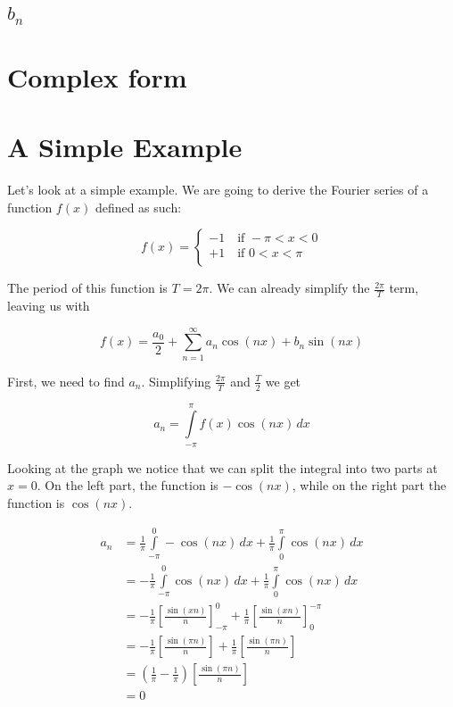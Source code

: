 \documentclass{article}
\newcommand{\integral}[4]{\int\limits_{#1}^{#2} #3\,d#4}
\begin{document}
\subsection{\(b_n\)}

\section{Complex form}

\pagebreak

\section{A Simple Example}

Let's look at a simple example. We are going to derive the Fourier series of a function \(f(x)\) defined as such:

\[
    f(x)=
    \begin{cases}
        -1\quad \text{if } -\pi < x < 0 \\
        +1\quad \text{if } 0 < x < \pi \\
    \end{cases}
\]

The period of this function is \(T=2\pi\). We can already simplify the \(\frac{2\pi}{T}\) term, leaving us with

\[
    f(x)=\frac{a_0}{2} + \sum_{n=1}^{\infty} a_n \cos(nx) + b_n \sin(nx)
\]

First, we need to find \(a_n\). Simplifying \(\frac{2\pi}{T}\) and \(\frac{T}{2}\) we get

\[
    a_n=\integral{-\pi}{\pi}{f(x)\cos(nx)}{x}
\]

Looking at the graph we notice that we can split the integral into two parts at \(x=0\).
On the left part, the function is \(-\cos(nx)\), while on the right part the function is \(\cos(nx)\).

\begin{align*}
    a_n &=
    \frac{1}{\pi} \integral{-\pi}{0}{-\cos(nx)}{x} +
    \frac{1}{\pi} \integral{0}{\pi}{\cos(nx)}{x} \\
    &= -\frac{1}{\pi} \integral{-\pi}{0}{\cos(nx)}{x} +
    \frac{1}{\pi} \integral{0}{\pi}{\cos(nx)}{x} \\
    &= -\frac{1}{\pi} {\left[\frac{\sin(xn)}{n}\right]}_{-\pi}^{0} +
    \frac{1}{\pi} {\left[\frac{\sin(xn)}{n}\right]}_{0}^{-\pi} \\
    &= -\frac{1}{\pi} \left[\frac{\sin(\pi n)}{n}\right] +
    \frac{1}{\pi} \left[\frac{\sin(\pi n)}{n}\right] \\
    &= \left(\frac{1}{\pi}-\frac{1}{\pi}\right) \left[\frac{\sin(\pi n)}{n}\right] \\
    &= 0
\end{align*}
\end{document}
